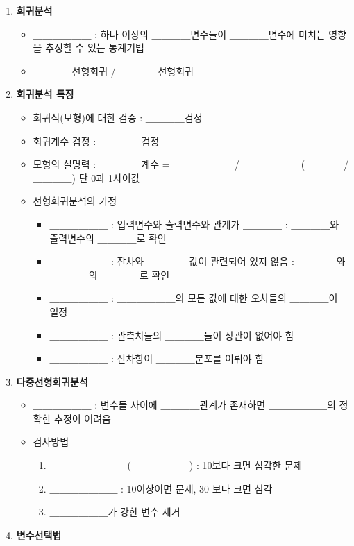 \documentclass[11pt]{article}
\providecommand{\tightlist}{%
      \setlength{\itemsep}{0pt}\setlength{\parskip}{0pt}}
\begin{document}
\begin{enumerate}
\def\labelenumi{\arabic{enumi}.}
\tightlist
\item
  \textbf{회귀분석}

  \begin{itemize}
  \tightlist
  \item
    ＿＿＿＿＿＿ : 하나 이상의 ＿＿＿＿변수들이 ＿＿＿＿변수에 미치는
    영향을 추정할 수 있는 통계기법
  \item
    ＿＿＿＿선형회귀 / ＿＿＿＿선형회귀 
  \end{itemize}
\item
  \textbf{회귀분석 특징}

  \begin{itemize}
  \tightlist
  \item
    회귀식(모형)에 대한 검증 : ＿＿＿＿검정
  \item
    회귀계수 검정 : ＿＿＿＿ 검정
  \item
    모형의 설명력 : ＿＿＿＿ 계수 = ＿＿＿＿＿＿ /
    ＿＿＿＿＿＿(＿＿＿＿/＿＿＿＿) 단 0과 1사이값
  \item
    선형회귀분석의 가정

    \begin{itemize}
    \tightlist
    \item
      ＿＿＿＿＿＿ : 입력변수와 출력변수와 관계가 ＿＿＿＿ : ＿＿＿＿와
      출력변수의 ＿＿＿＿로 확인
    \item
      ＿＿＿＿＿＿ : 잔차와 ＿＿＿＿ 값이 관련되어 있지 않음 :
      ＿＿＿＿와 ＿＿＿＿의 ＿＿＿＿로 확인
    \item
      ＿＿＿＿＿＿ : ＿＿＿＿＿＿의 모든 값에 대한 오차들의 ＿＿＿＿이
      일정
    \item
      ＿＿＿＿＿＿ : 관측치들의 ＿＿＿＿들이 상관이 없어야 함
    \item
      ＿＿＿＿＿＿ : 잔차항이 ＿＿＿＿분포를 이뤄야 함 
    \end{itemize}
  \end{itemize}
\item
  \textbf{다중선형회귀분석}

  \begin{itemize}
  \tightlist
  \item
    ＿＿＿＿＿＿ : 변수들 사이에 ＿＿＿＿관계가 존재하면 ＿＿＿＿＿＿의
    정확한 추정이 어려움
  \item
    검사방법

    \begin{enumerate}
    \def\labelenumii{\arabic{enumii}.}
    \tightlist
    \item
      ＿＿＿＿＿＿＿＿(＿＿＿＿＿＿) : 10보다 크면 심각한 문제
    \item
      ＿＿＿＿＿＿＿ : 10이상이면 문제, 30 보다 크면 심각
    \item
      ＿＿＿＿＿＿가 강한 변수 제거 
    \end{enumerate}
  \end{itemize}
\item
  \textbf{변수선택법}


\end{enumerate}
\end{document}
